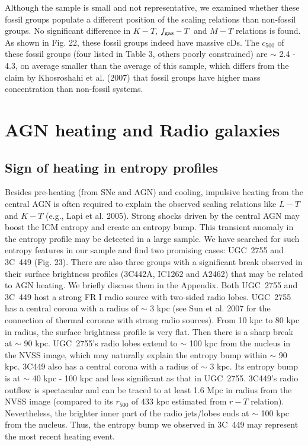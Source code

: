 \documentclass{aastex}
\begin{document}
Although the sample is small and not representative, we examined whether these
fossil groups populate a different position of the scaling relations than
non-fossil groups. No significant difference in $K - T$, $f_{\rm gas} - T$ and $M - T$
relations is found. As shown in Fig. 22, these fossil groups indeed have massive cDs.
The $c_{500}$ of these fossil groups (four listed in Table 3, others poorly constrained)
are $\sim$ 2.4 - 4.3, on average smaller than the average of this sample, which differs
from the claim by Khosroshahi et al. (2007) that fossil groups have higher mass
concentration than non-fossil systems.

\section{AGN heating and Radio galaxies}

\subsection{Sign of heating in entropy profiles}

Besides pre-heating (from SNe and AGN) and cooling, impulsive heating from
the central AGN is often required to explain the observed scaling relations
like $L - T$ and $K - T$ (e.g., Lapi et al. 2005). Strong shocks driven by the
central AGN may boost the ICM entropy and create an entropy bump. This transient
anomaly in the entropy profile may be detected in a large sample. We have searched
for such entropy features in our sample and find two promising cases: UGC~2755 and
3C~449 (Fig. 23). There are also three groups with a significant break observed in their
surface brightness profiles (3C442A, IC1262 and A2462) that may be related to AGN
heating. We briefly discuss them in the Appendix.
Both UGC~2755 and 3C~449 host a strong FR I radio source with two-sided radio lobes.
UGC~2755 has a central corona with a radius of $\sim$ 3 kpc (see Sun et al. 2007 for
the connection of thermal coronae with strong radio sources).
From 10 kpc to 80 kpc in radius, the surface brightness profile
is very flat. Then there is a sharp break at $\sim$ 90 kpc.
UGC~2755's radio lobes extend to $\sim$ 100 kpc from the nucleus in the NVSS image,
which may naturally explain the entropy bump within $\sim$ 90 kpc.
3C449 also has a central corona with a radius of $\sim$ 3 kpc.
Its entropy bump is at $\sim$ 40 kpc - 100 kpc and less significant as
that in UGC~2755. 3C449's radio outflow is spectacular and can
be traced to at least 1.6 Mpc in radius from the NVSS image (compared to its
$r_{500}$ of 433 kpc estimated from $r - T$ relation).
Nevertheless, the brighter inner part of the radio jets/lobes
ends at $\sim$ 100 kpc from the nucleus. Thus, the entropy bump we observed
in 3C~449 may represent the most recent heating event.
\end{document}
